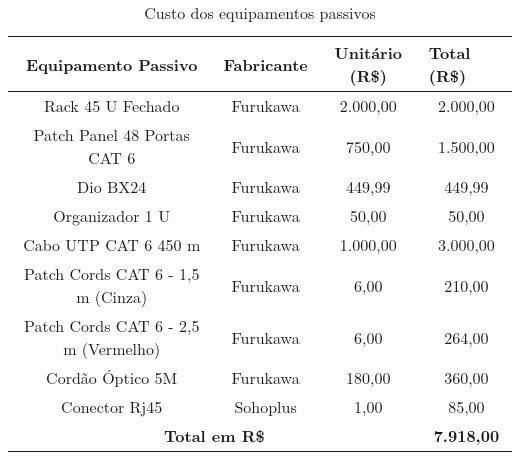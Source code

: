   
\begin{table}[h!]
	\begin{center}
		\caption{Custo dos equipamentos passivos}
		\label{tab10}
		\renewcommand{\arraystretch}{1.2}
		\begin{tabular}{|c|c|c|c|}
			\hline
			\textbf{Equipamento Passivo}                 & \textbf{Fabricante} & \textbf{ Unitário (R\$)} & \multicolumn{1}{l|}{\textbf{Total (R\$)}} \\ \hline
			Rack 45 U Fechado                           & Furukawa             & 2.000,00                         & 2.000,00                                           \\ \hline
			Patch Panel 48 Portas CAT 6   & Furukawa            & 750,00                           & 1.500,00                                           \\ \hline
			Dio  BX24               & Furukawa             & 449,99                            & 449,99                                             \\ \hline
			Organizador 1 U           & Furukawa            & 50,00                           & 50,00                                           \\ \hline
			Cabo UTP CAT 6 450 m           & Furukawa            & 1.000,00                           & 3.000,00                                             \\ \hline
			Patch Cords CAT 6 - 1,5 m (Cinza)            & Furukawa            & 6,00                            & 210,00                                           \\ \hline
			Patch Cords CAT 6 - 2,5 m (Vermelho)            & Furukawa            & 6,00                            & 264,00                                             \\ \hline
			Cordão Óptico 5M                              & Furukawa                 & 180,00                            & 360,00                                             \\ \hline
			Conector Rj45                              & Sohoplus                 & 1,00                            & 85,00                                             \\ \hline
			\multicolumn{3}{|c|}{\textbf{Total em R\$}}                                                           & \textbf{7.918,00}                                  \\ \hline
		\end{tabular}
	\end{center}
\end{table}
